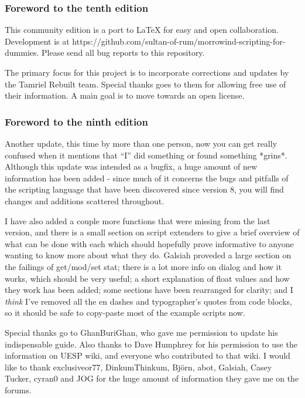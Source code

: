 \documentclass[oneside]{article}
\begin{document}
\hypertarget{foreword-to-the-tenth-edition}{%
\subsubsection{\texorpdfstring{\hfill\break
Foreword to the tenth edition}{Foreword to the ninth edition}}\label{foreword-to-the-tenth-edition}}

This community edition is a port to LaTeX for easy and open collaboration. Development is at https://github.com/sultan-of-rum/morrowind-scripting-for-dummies. Please send all bug reports to this repository.

The primary focus for this project is to incorporate corrections and updates by the Tamriel Rebuilt team. Special thanks goes to them for allowing free use of their information. A main goal is to move towards an open license. %

\hypertarget{foreword-to-the-ninth-edition}{%
\subsubsection{\texorpdfstring{\hfill\break
Foreword to the ninth edition}{Foreword to the ninth edition}}\label{foreword-to-the-ninth-edition}}

Another update, this time by more than one person, now you can get really confused when it mentions that ``I'' did something or found something *grins*. Although this update was intended as a bugfix, a huge amount of new information has been added - since much of it concerns the bugs and pitfalls of the scripting language that have been discovered since version 8, you will find changes and additions scattered throughout.

I have also added a couple more functions that were missing from the last version, and there is a small section on script extenders to give a brief overview of what can be done with each which should hopefully prove informative to anyone wanting to know more about what they do. Galsiah proveded a large section on the failings of get/mod/set stat; there is a lot more info on dialog and how it works, which should be very useful; a short explanation of float values and how they work has
been added; some sections have been rearranged for clarity; and I \emph{think} I've removed all the en dashes and typographer's quotes from code blocks, so it should be safe to copy-paste most of the example scripts now.

Special thanks go to GhanBuriGhan, who gave me permission to update his indispensable guide. Also thanks to Dave Humphrey for his permission to use the information on UESP wiki, and everyone who contributed to that wiki. I would like to thank exclusiveor77, DinkumThinkum, Björn, abot, Galsiah, Casey Tucker, cyran0 and JOG for the huge amount of information they gave me on the forums.
\end{document}

